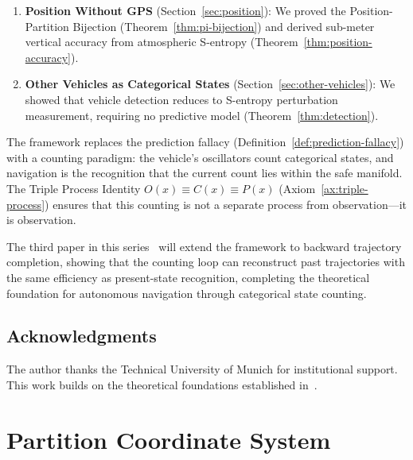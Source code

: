 \documentclass[twocolumn,10pt]{article}
\theoremstyle{definition}
\theoremstyle{remark}
\begin{document}
\begin{enumerate}
  \item \textbf{Position Without GPS} (Section~\ref{sec:position}):
    We proved the Position-Partition Bijection
    (Theorem~\ref{thm:pi-bijection}) and derived sub-meter vertical
    accuracy from atmospheric S-entropy
    (Theorem~\ref{thm:position-accuracy}).

  \item \textbf{Other Vehicles as Categorical States}
    (Section~\ref{sec:other-vehicles}): We showed that vehicle detection
    reduces to S-entropy perturbation measurement, requiring no predictive
    model (Theorem~\ref{thm:detection}).
\end{enumerate}

The framework replaces the prediction fallacy
(Definition~\ref{def:prediction-fallacy}) with a counting paradigm:
the vehicle's oscillators count categorical states, and navigation is the
recognition that the current count lies within the safe manifold. The
Triple Process Identity $O(x) \equiv C(x) \equiv P(x)$
(Axiom~\ref{ax:triple-process}) ensures that this counting is not a
separate process from observation---it is observation.

The third paper in this series~\cite{sachikonye2026backward} will extend
the framework to backward trajectory completion, showing that the counting
loop can reconstruct past trajectories with the same efficiency as
present-state recognition, completing the theoretical foundation for
autonomous navigation through categorical state counting.

\subsection*{Acknowledgments}

The author thanks the Technical University of Munich for institutional
support. This work builds on the theoretical foundations established
in~\cite{sachikonye2026poincare,sachikonye2026partition,sachikonye2026atmospheric,sachikonye2026transplanckian,sachikonye2026instrument}.




\appendix

\section{Partition Coordinate System}\label{app:partition}
\end{document}
